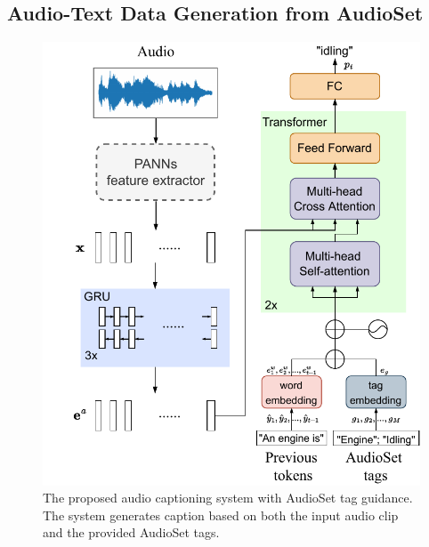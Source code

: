 \documentclass[sigconf]{acmart}
\begin{document}
\subsection{Audio-Text Data Generation from AudioSet}
\label{subsec:syn_data_generation}

\begin{figure}[ht]
    \centering
    \includegraphics[width=\linewidth]{figs/tag_caption_model.pdf}
    \caption{The proposed audio captioning system with AudioSet tag guidance. The system generates caption based on both the input audio clip and the provided AudioSet tags.}
    \label{fig:tag_caption_model}
\end{figure}
\end{document}
